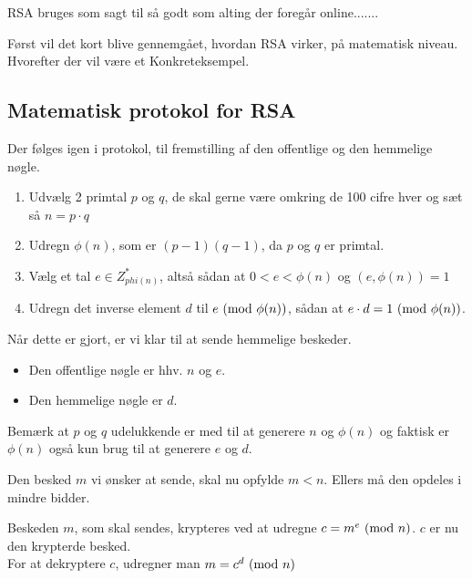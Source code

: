 RSA bruges som sagt til så godt som alting der foregår online.......

Først vil det kort blive gennemgået, hvordan RSA virker, på matematisk niveau. Hvorefter der vil være et Konkreteksempel.

\subsection{Matematisk protokol for RSA}\label{rsaprot}
Der følges igen i protokol, til fremstilling af den offentlige og den hemmelige nøgle.

\begin{enumerate} %
    \item Udvælg 2 primtal \(p\) og \(q\), de skal gerne være omkring de 100 cifre hver og sæt så \(n = p \cdot q\)
    \item Udregn \(\phi(n)\), som er \((p - 1) (q - 1)\), da \(p\) og \(q\) er primtal.
    \item Vælg et tal \(e \in Z_{phi(n)}^*\), altså sådan at \(0 < e < \phi(n)\) og \((e, \phi(n)) = 1\)
    \item Udregn det inverse element \(d\) til \(e \ (\mathrm{mod}\ \phi(n))\), sådan at \(e \cdot d = 1 \ (\mathrm{mod}\ \phi(n))\). \label{stepfour}
\end{enumerate}

Når dette er gjort, er vi klar til at sende hemmelige beskeder.

\begin{itemize} %
    \item Den offentlige nøgle er hhv. \(n\) og \(e\).
    \item Den hemmelige nøgle er \(d\).
\end{itemize}

Bemærk at \(p\) og \(q\) udelukkende er med til at generere \(n\) og \(\phi(n)\) og faktisk er \(\phi(n)\) også kun brug til at generere \(e\) og \(d\).

Den besked \(m\) vi ønsker at sende, skal nu opfylde \(m < n\). Ellers må den opdeles i mindre bidder.

Beskeden \(m\), som skal sendes, krypteres ved at udregne \(c = m^e \ (\mathrm{mod}\ n)\). \(c\) er nu den krypterde besked.\\
For at dekryptere \(c\), udregner man \(m = c^d \ (\mathrm{mod}\ n)\)\\

